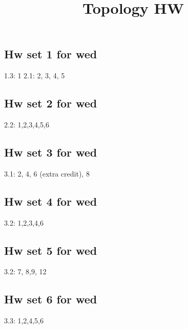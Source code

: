 \documentclass{amsart}
\numberwithin{equation}{section}
\theoremstyle{definition}
\theoremstyle{remark}
\begin{document}
\title{Topology HW}
\maketitle
\subsection*{Hw set 1 for wed}
1.3: 1  
2.1: 2, 3, 4, 5  
\subsection*{Hw set 2 for wed}
2.2: 1,2,3,4,5,6
\subsection*{Hw set 3 for wed}
3.1: 2, 4, 6 (extra credit), 8
\subsection*{Hw set 4 for wed}
3.2: 1,2,3,4,6
\subsection*{Hw set 5 for wed}
3.2: 7, 8,9, 12
\subsection*{Hw set 6 for wed}
3.3: 1,2,4,5,6   
\end{document}
